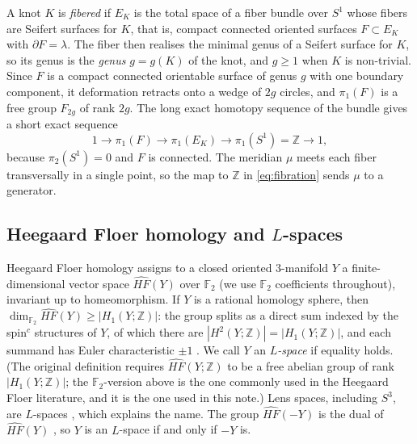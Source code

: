\documentclass[12pt]{article}
\newcommand{\Z}{\mathbb Z}
\newcommand{\F}{\mathbb F}
\newcommand{\HFhat}{\widehat{HF}}
\theoremstyle{definition}
\theoremstyle{remark}
\begin{document}
A knot \(K\) is \emph{fibered} if \(E_K\) is the total space of a fiber
bundle over \(S^1\) whose fibers are Seifert surfaces for \(K\), that is,
compact connected oriented surfaces \(F\subset E_K\) with
\(\partial F=\lambda\). The fiber then realises the minimal genus of a
Seifert surface for \(K\), so its genus is the \emph{genus} \(g=g(K)\)
of the knot, and \(g\geq1\) when \(K\) is non-trivial. Since \(F\) is a
compact connected orientable surface of genus \(g\) with one boundary
component, it deformation retracts onto a wedge of \(2g\) circles, and
\(\pi_1(F)\) is a free group \(F_{2g}\) of rank \(2g\). The long exact
homotopy sequence of the bundle gives a short exact sequence
\begin{equation}\label{eq:fibration}
 1\longrightarrow\pi_1(F)\longrightarrow\pi_1(E_K)
 \longrightarrow\pi_1(S^1)=\Z\longrightarrow1,
\end{equation}
because \(\pi_2(S^1)=0\) and \(F\) is connected. The meridian \(\mu\)
meets each fiber transversally in a single point, so the map to \(\Z\)
in \eqref{eq:fibration} sends \(\mu\) to a generator.

\subsection{Heegaard Floer homology and \texorpdfstring{\(L\)}{L}-spaces}\label{sec:Lspace}

Heegaard Floer homology \cite{OS2004a} assigns to a closed oriented
\(3\)-manifold \(Y\) a finite-dimensional vector space \(\HFhat(Y)\) over
\(\F_2\) (we use \(\F_2\) coefficients throughout), invariant up to
homeomorphism. If \(Y\) is a rational homology sphere, then
\(\dim_{\F_2}\HFhat(Y)\geq|H_1(Y;\Z)|\): the group splits as a direct
sum indexed by the spin\(^c\) structures of \(Y\), of which there are
\(|H^2(Y;\Z)|=|H_1(Y;\Z)|\), and each summand has Euler characteristic
\(\pm1\) \cite[Proposition~5.1]{OS2004b}. We call \(Y\) an
\emph{\(L\)-space} if equality holds. (The original definition
\cite[Definition~1.1]{OS2005} requires \(\HFhat(Y;\Z)\) to be a free
abelian group of rank \(|H_1(Y;\Z)|\); the \(\F_2\)-version above is
the one commonly used in the Heegaard Floer literature, and it is the one
used in this note.)
Lens spaces, including \(S^3\), are \(L\)-spaces
\cite[Proposition~3.1]{OS2004b}, which explains the name. The group
\(\HFhat(-Y)\) is the dual of \(\HFhat(Y)\)
\cite[Proposition~2.5]{OS2004b}, so \(Y\) is an \(L\)-space if and only
if \(-Y\) is.
\end{document}
